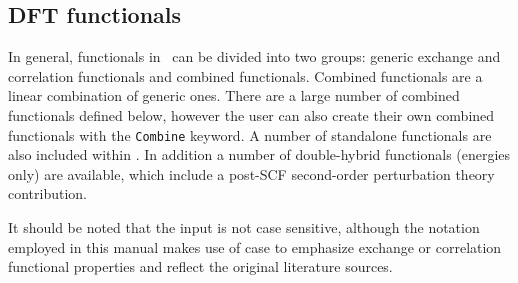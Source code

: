 \subsection{\label{ref-dft}DFT functionals}

In general, functionals in \dalton\ can be divided into two groups: 
generic exchange and correlation functionals 
and combined functionals. Combined functionals are a linear combination of
generic ones. There are a large number of combined functionals defined below, 
however the user can also create their own combined functionals with 
the \verb|Combine| keyword. 
A number of standalone functionals are also included within \dalton. 
In addition a number of double-hybrid functionals (energies only) are available,
which include a post-SCF second-order perturbation theory contribution. 

It should be noted that the input is not case sensitive, although the notation
employed in this manual makes use of case to emphasize exchange or correlation 
functional properties and reflect the original literature sources.


